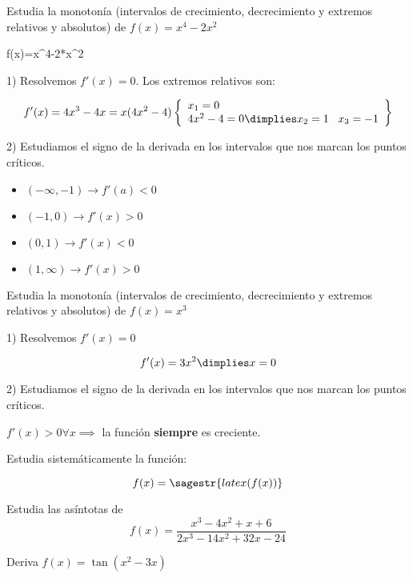 \documentclass[palatino,nosec]{Docencia}
\begin{document}
\begin{problem} Estudia la monotonía (intervalos de crecimiento, decrecimiento y extremos relativos y absolutos) de $f(x) = x^4-2x^2$
	\begin{sagesilent}
		f(x)=x^4-2*x^2
	\end{sagesilent}

	\solution
	
	1) Resolvemos $f'(x) = 0$. Los extremos relativos son:

	
	\[
	f'(x) = 4x^3-4x =x(4x^2-4)   \left\{\begin{array}{l}
	x_1=0\\
	4x^2-4 = 0 \dimplies x_2 = 1 \;\;\; x_3= -1
	\end{array}\right\}
	\]
	
	2) Estudiamos el signo de la derivada en los intervalos que nos marcan los puntos críticos. 
	
	
	\begin{itemize}
		\item $(-\infty,-1) \to f'(a) < 0$
		\item $(-1,0) \to f'(x) > 0$
		\item $(0,1) \to f'(x) < 0$
		\item $(1,\infty) \to f'(x) > 0$
	\end{itemize}
	
\end{problem}

\begin{problem} Estudia la monotonía (intervalos de crecimiento, decrecimiento y extremos relativos y absolutos) de $f(x) = x^3$
	\solution
	
	1) Resolvemos $f'(x) = 0$
	
	\[
	f'(x) = 3x^2 \dimplies x=0
	\]
	
	2) Estudiamos el signo de la derivada en los intervalos que nos marcan los puntos críticos.
	
	$f'(x) > 0 \forall x \implies$ la función \textbf{siempre} es creciente.
	
\end{problem}


\newcommand{\newexample}[1]{
	
	
	\newpage
}





\begin{problem} 

	Estudia sistemáticamente la función:
	
	\[f(x) =\sagestr{latex(f(x))}\]
	
	\solution


	\newexample{tex/fun}
\end{problem}


\begin{problem} Estudia las asíntotas de \[f(x) =\frac{x^3-4x^2+x+6}{2x^3-14x^2+32x-24}\]
\solution
\end{problem}
\begin{problem} Deriva $f(x) = \tan(x^2-3x)$
\solution
\end{problem}
\end{document}

